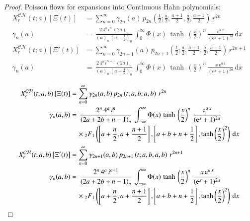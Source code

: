 \documentclass[a4paper,11pt,twoside]{amsart}
\newcommand{\verifiedeq}{=}
\newcommand{\verifiedeq}{\stackrel{\checkmark}{=}}
\begin{document}
\begin{proof}
Poisson flows for expansions into Continuous Hahn polynomials:
\begin{align}
 X^\mathcal{CH}_r(t;a)\left[\Xi(t)\right] &\verifiedeq \sum_{n=0}^\infty \gamma_{2n}(a)\,p_{2n}\left(\frac{t}{2};\frac{a}{2},\frac{a+1}{2},\frac{a}{2},\frac{a+1}{2}\right)\, r^{2n} \\
\gamma_n(a) &\verifiedeq \,\frac{2\,4^a\,i^n \,(2a)_n}{(a)_n\,\left(a+\frac12\right)_n} \,\int_{0}^{\infty} \Phi(x)\,\tanh\,\left(\frac{x}{2}\right)^n\,\frac{\textrm{e}^{a\,x}}{(\textrm{e}^{x}+1)^{2a}}\,\mathrm{d}x\\
 X^\mathcal{CH}_r(t;a)\left[\Xi'(t)\right] &\verifiedeq \sum_{n=0}^\infty \gamma_{2n+1}(a)\,p_{2n+1}\left(\frac{t}{2};\frac{a}{2},\frac{a+1}{2},\frac{a}{2},\frac{a+1}{2}\right)\, r^{2n+1} \\
\gamma_n(a) &\verifiedeq \,\frac{2\,4^a\,i^{n+1} \,(2a)_n}{(a)_n\,\left(a+\frac12\right)_n} \,\int_{0}^{\infty} \Phi(x)\,\tanh\,\left(\frac{x}{2}\right)^n\,\frac{x\,\textrm{e}^{a\,x}}{(\textrm{e}^{x}+1)^{2a}}\,\mathrm{d}x
\end{align} 

\begin{align}
 X^\mathcal{CH}_r(t;a,b)\left[\Xi(t)\right] &\verifiedeq \sum_{n=0}^\infty \gamma_{2n}(a,b)\,p_{2n}\left(t;a,b,a,b\right)\, r^{2n} \\
\gamma_n(a,b) &\verifiedeq \,\frac{2^{n}\,4^a\,i^n}{\left(2a+2b+n-1\right)_n} \,\int_{-\infty}^{\infty} \Phi(x)\,\tanh\,\left(\frac{x}{2}\right)^n\,\frac{\textrm{e}^{a\,x}}{(\textrm{e}^{x}+1)^{2a}}\\ &\quad \times{}_2F_1\left(\left[a+\frac{n}{2}, a+\frac{n+1}{2}\right],\left[a+b+n+\frac12\right],\tanh\left(\frac{x}{2}\right)^2\right)\,\mathrm{d}x \notag\\
 X^\mathcal{CH}_r(t;a,b)\left[\Xi'(t)\right] &\verifiedeq \sum_{n=0}^\infty \gamma_{2n+1}(a,b)\,p_{2n+1}\left(t;a,b,a,b\right)\, r^{2n+1} \\
\gamma_n(a,b) &\verifiedeq \,\frac{2^{n}\,4^a\,i^{n+1}}{\left(2a+2b+n-1\right)_n} \,\int_{-\infty}^{\infty} \Phi(x)\,\tanh\,\left(\frac{x}{2}\right)^n\,\frac{x\,\textrm{e}^{a\,x}}{(\textrm{e}^{x}+1)^{2a}}\\ &\quad \times{}_2F_1\left(\left[a+\frac{n}{2}, a+\frac{n+1}{2}\right],\left[a+b+n+\frac12\right],\tanh\left(\frac{x}{2}\right)^2\right)\,\mathrm{d}x \notag
\end{align} 


\end{proof}
\end{document}
